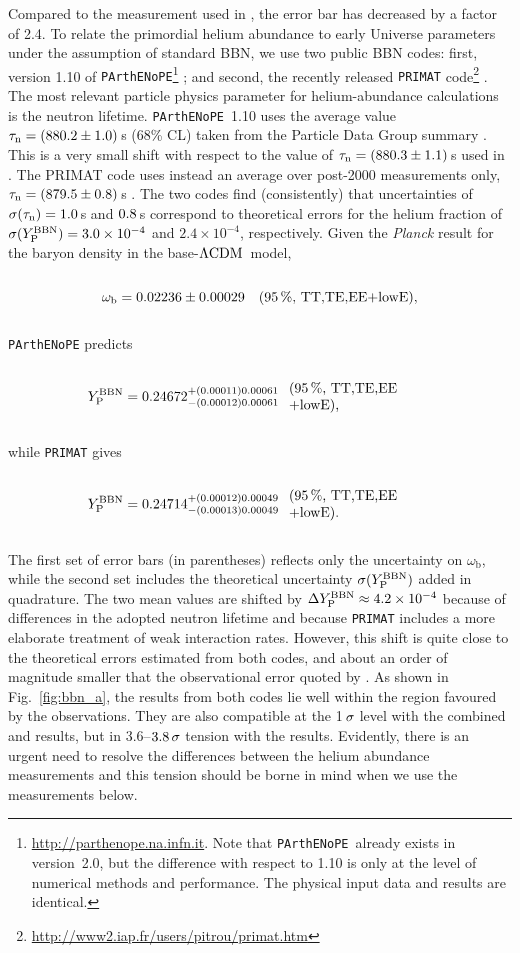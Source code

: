 \documentclass[longauth,traditabstract]{aa}
\def\Planck{\textit{Planck}}
\def\,{\thinspace}
\newcommand{\leftparbox}[2]{\parbox{#1}{\begin{flushleft} #2 \end{flushleft}}}
\newcommand{\onetwosig}[4][5cm]{
\begin{equation}
\left.
  #2 \quad\mbox{\text{\leftparbox{#1}{(95\,\%,~#3)#4}}}
  \right.
\end{equation}
}
\newcommand{\mksym}[1]{\ifmmode {\rm #1}\else #1\fi}
\newcommand{\dataplus}{\allowbreak+}
\newcommand{\TTTEEE}{\mksym{TT,TE,EE}}
\newcommand{\lowE}{\mksym{lowE}}
\newcommand{\parthenope}{{\tt PArthENoPE}}
\newcommand{\shortall}{\TTTEEE\dataplus\lowE}
\newcommand{\lcdm}{\texorpdfstring{{$\rm{\Lambda CDM}$}}{ΛCDM}}
\newcommand{\ypbbn}{Y_{\text{P}}^{\rm BBN}}
\newcommand{\taun}{\tau_{\rm n}}
\providecommand{\text}[1]{\rm{#1}}
\providecommand{\omb}{\omega_{\mathrm{b}}}
\def\beglet{
  \addtocounter{equation}{1}%
  \setcounter{parentequation}{\value{equation}}%
  \setcounter{equation}{0}%
  \def\theequation{\arabic{parentequation}\alph{equation}}%
  \ignorespaces
}
\def\endlet{
  \setcounter{equation}{\value{parentequation}}%
  \def\theequation{\arabic{equation}}%
}
\providecommand{\beglet}{\begin{subequations}}
\providecommand{\endlet}{\end{subequations}}
\newcommand{\paramsII}{\citetalias{planck2014-a15}}
\begin{document}
Compared to the measurement used in \paramsII, the \citet{Aver:2015iza} error bar has decreased by a factor of 2.4.
To relate the primordial helium abundance to early Universe parameters under the assumption of standard BBN, we use two public BBN codes: first, version 1.10 of
\parthenope\footnote{\url{http://parthenope.na.infn.it}.
Note that \parthenope\ already exists in version~2.0, but the
difference with respect to 1.10 is only at the level of numerical
methods and performance. The physical input data and results are
identical.} \citep{Pisanti:2007hk}; and second, the recently released
{\tt PRIMAT}
code\footnote{\url{http://www2.iap.fr/users/pitrou/primat.htm}} \citep{Pitrou:2018cgg}. The
most relevant particle physics parameter for helium-abundance
calculations is the neutron lifetime. \parthenope\ 1.10 uses the
average value $\taun=(880.2\pm 1.0)\,$s (68\,\% CL) taken from the
Particle Data Group summary \citep{Patrignani:2016xqp}. This is a very
small shift with respect to the value of $\taun=(880.3\pm 1.1)\,$s
used in \paramsII. The PRIMAT code uses instead an average over
post-2000 measurements only, $\taun=(879.5\pm 0.8)\,$s \citep[68\,\%
CL,][]{Serebrov:2017bzo}. The two codes find (consistently) that
uncertainties of $\sigma(\taun)=1.0\,$s and $0.8\,$s correspond to
theoretical errors for the helium fraction of
$\sigma(\ypbbn)=3.0 \times 10^{-4}$ and $2.4 \times 10^{-4}$,
respectively.  Given the \Planck{} result for the baryon density in
the base-\lcdm\ model,
\onetwosig[4cm]{\omb = 0.02236 \pm 0.00029}{\shortall}{,\label{bbn:omegab}}
\parthenope{} predicts
\beglet
\onetwosig[3.6cm]{\ypbbn=
0.24672^{+(0.00011)0.00061}_{-(0.00012)0.00061}\hspace{-1mm}}{\shortall}{,}
while {\tt PRIMAT} gives
\onetwosig[3.6cm]{\ypbbn=0.24714^{+(0.00012)0.00049}_{-(0.00013)0.00049}\hspace{-1mm} }{\shortall}{.}
\endlet
The first set of error bars (in parentheses)
reflects only the uncertainty on $\omb$, while the second set
includes the theoretical uncertainty $\sigma(\ypbbn)$ added in
quadrature. The two mean values are shifted by $\Delta \ypbbn \approx 4.2 \times 10^{-4}$ because of differences in the adopted
neutron lifetime and because {\tt PRIMAT} includes a more elaborate treatment of weak interaction rates. However, this shift is quite close to the theoretical
errors estimated from both codes, and about an order of magnitude smaller that the observational error quoted by \cite{Aver:2015iza}.  As shown in Fig.~\ref{fig:bbn_a},
 the results from both codes
lie well within the region favoured by the \citet{Aver:2015iza} observations. They are also compatible at the 1$\,\sigma$ level with the combined \citet{Aver:2015iza} and \citet{Peimbert:2016bdg} results, but in 3.6--$3.8\,\sigma$ tension with
the \citet{Izotov:2014fga} results. Evidently, there is an urgent need to resolve the differences between
the helium abundance measurements and this tension should be borne in mind when we use the \citet{Aver:2015iza} measurements
 below.
\end{document}
